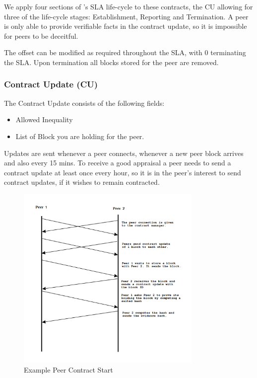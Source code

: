 \documentclass[11pt, a4paper, twocolumn, twoside]{report}
\begin{document}
We apply four sections of \cite{keller2002defining}'s SLA life-cycle to these contracts, the CU allowing for three of the life-cycle stages: Establishment, Reporting and Termination. A peer is only able to provide verifiable facts in the contract update, so it is impossible for peers to be deceitful.

The offset can be modified as required throughout the SLA, with 0 terminating the SLA. Upon termination all blocks stored for the peer are removed.

\subsubsection{Contract Update (CU)}

The Contract Update consists of the following fields:

\begin{itemize}
 \item Allowed Inequality
 \item List of Block you are holding for the peer.
\end{itemize}

Updates are sent whenever a peer connects, whenever a new peer block arrives and also every 15 mins. To receive a good appraisal a peer needs to send a contract update at least once every hour, so it is in the peer's interest to send contract updates, if it wishes to remain contracted.

\begin{figure}[h]
 \centering
 \includegraphics[width=0.8\textwidth]{contract-start}
 \caption{Example Peer Contract Start}
 \label{fig:contract-start}
\end{figure}
\end{document}
